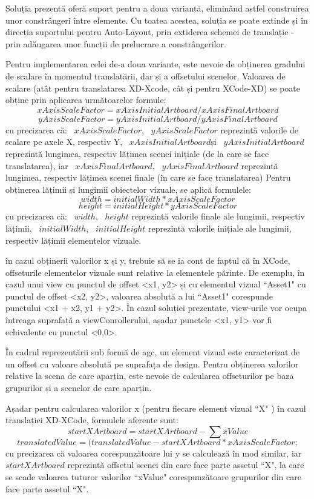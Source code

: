 Soluția prezentă oferă suport pentru a doua variantă, eliminând astfel construirea unor constrângeri între elemente. Cu toatea acestea, soluția se poate extinde și în direcția suportului pentru Auto-Layout, prin extiderea schemei de translație - prin adăugarea unor funcții de prelucrare a constrângerilor.

Pentru implementarea celei de-a doua variante, este nevoie de obținerea gradului de scalare în momentul translatării, dar și a offsetului scenelor. Valoarea de scalare (atât pentru translatarea XD-Xcode, cât și pentru XCode-XD) se poate obține prin aplicarea următoarelor formule: 
\[ xAxisScaleFactor =  xAxisInitialArtboard/ xAxisFinalArtboard\]
\[ yAxisScaleFactor =  yAxisInitialArtboard/ yAxisFinalArtboard\]
cu precizarea că:
 ~$xAxisScaleFactor$, ~$yAxisScaleFactor$ reprezintă valorile de scalare pe axele X, respectiv Y,  ~$xAxisInitialArtboard$și ~$yAxisInitialArtboard$ reprezintă lungimea, respectiv lățimea scenei inițiale (de la care se face translatarea), iar ~$xAxisFinalArtboard$, ~$yAxisFinalArtboard$ reprezintă lungimea, respectiv lățimea scenei finale (în care se face translatarea)
Pentru obținerea lățimii și lungimii obiectelor vizuale, se aplică formulele:
\[ width =  initialWidth *  xAxisScaleFactor\]
\[ height =  initialHeight * yAxisScaleFactor\]
cu precizarea că:
~$width$, ~$height$ reprezintă valorile finale ale lungimii, respectiv lățimii, ~$initialWidth$, ~$initialHeight$ reprezintă valorile inițiale ale lungimii, respectiv lățimii elementelor vizuale.

în cazul obținerii valorilor x și y, trebuie să se ia cont de faptul că în XCode, offseturile elementelor vizuale sunt relative la elementele părinte. De exemplu, în cazul unui view cu punctul de offset <x1, y2> și cu elementul vizual ``Asset1" cu punctul de offset <x2, y2>, valoarea absolută a lui ``Asset1" corespunde punctului <x1 + x2, y1 + y2>. În cazul soluției prezentate, view-urile vor ocupa întreaga suprafață a viewConrollerului, așadar punctele <x1, y1> vor fi echivalente cu punctul <0,0>.

În cadrul reprezentării sub formă de agc, un element vizual este caracterizat de un offset cu valoare absolută pe suprafața de design. Pentru obținerea valorilor relative la scena de care aparțin, este nevoie de calcularea offseturilor pe baza grupurilor și a scenelor de care aparțin.

Așadar pentru calcularea valorilor x (pentru fiecare element vizual ``X" ) în cazul translației XD-XCode, formulele aferente sunt:
        \[ startXArtboard = startXArtboard - \sum{xValue} \]
        \[ translatedValue = (translatedValue - startXArtboard * xAxisScaleFactor;\]
cu precizarea că valoarea corespunzătoare lui y se calculează în mod similar, iar ~$startXArtboard$ reprezintă offsetul scenei din care face parte assetul ``X", la care se scade valoarea tuturor valorilor ``xValue" corespunzătoare grupurilor din care face parte assetul ``X". 

